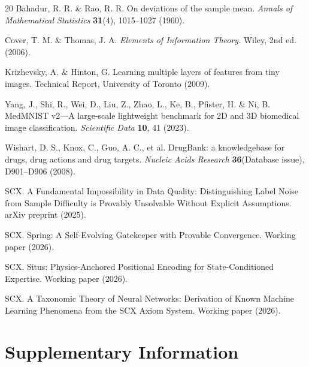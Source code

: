 \documentclass[12pt,a4paper]{article}
\theoremstyle{definition}
\theoremstyle{plain}
\theoremstyle{remark}
\begin{document}
\begin{thebibliography}{20}
 Bahadur, R. R. \& Rao, R. R. On deviations of the sample mean. \textit{Annals of Mathematical Statistics} \textbf{31}(4), 1015--1027 (1960).

 Cover, T. M. \& Thomas, J. A. \textit{Elements of Information Theory}. Wiley, 2nd ed. (2006).

 Krizhevsky, A. \& Hinton, G. Learning multiple layers of features from tiny images. Technical Report, University of Toronto (2009).

 Yang, J., Shi, R., Wei, D., Liu, Z., Zhao, L., Ke, B., Pfister, H. \& Ni, B. MedMNIST v2---A large-scale lightweight benchmark for 2D and 3D biomedical image classification. \textit{Scientific Data} \textbf{10}, 41 (2023).

 Wishart, D. S., Knox, C., Guo, A. C., et al. DrugBank: a knowledgebase for drugs, drug actions and drug targets. \textit{Nucleic Acids Research} \textbf{36}(Database issue), D901--D906 (2008).

 SCX. A Fundamental Impossibility in Data Quality: Distinguishing Label Noise from Sample Difficulty is Provably Unsolvable Without Explicit Assumptions. arXiv preprint (2025).

 SCX. Spring: A Self-Evolving Gatekeeper with Provable Convergence. Working paper (2026).

 SCX. Situs: Physics-Anchored Positional Encoding for State-Conditioned Expertise. Working paper (2026).

 SCX. A Taxonomic Theory of Neural Networks: Derivation of Known Machine Learning Phenomena from the SCX Axiom System. Working paper (2026).

\end{thebibliography}

\section{Supplementary Information}








\end{document}

